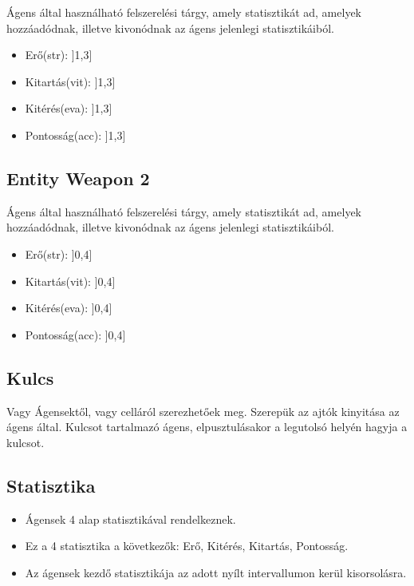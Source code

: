 Ágens által használható felszerelési tárgy, amely statisztikát ad, amelyek hozzáadódnak, illetve kivonódnak az ágens jelenlegi statisztikáiból.

\begin{itemize}
    \item Erő(str): ]1,3]
    \item Kitartás(vit): ]1,3]
    \item Kitérés(eva): ]1,3]
    \item Pontosság(acc): ]1,3]
\end{itemize}

\subsection{Entity Weapon 2}

Ágens által használható felszerelési tárgy, amely statisztikát ad, amelyek hozzáadódnak, illetve kivonódnak az ágens jelenlegi statisztikáiból.

\begin{itemize}
    \item Erő(str): ]0,4]
    \item Kitartás(vit): ]0,4]
    \item Kitérés(eva): ]0,4]
    \item Pontosság(acc): ]0,4]
\end{itemize}

\subsection{Kulcs}

Vagy Ágensektől, vagy celláról szerezhetőek meg.
Szerepük az ajtók kinyitása az ágens által.
Kulcsot tartalmazó ágens, elpusztulásakor a legutolsó helyén hagyja a kulcsot.


\subsection{Statisztika}
\label{statisztika}
\begin{itemize}
    \item Ágensek 4 alap statisztikával rendelkeznek.
    \item Ez a 4 statisztika a következők: Erő, Kitérés, Kitartás, Pontosság.
    \item Az ágensek kezdő statisztikája az adott nyílt intervallumon kerül kisorsolásra.
\end{itemize}

